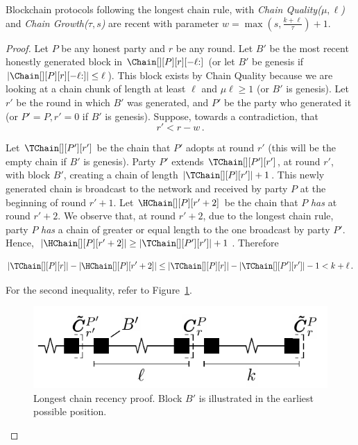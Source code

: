 \begin{lemma}\label{thm.longest-chain-recency}
  Blockchain protocols following the longest chain rule,
  with \emph{Chain Quality($\mu,\ell$)} and
  \emph{Chain Growth($\tau, s$)}
  are recent with parameter $w = \max(s, \frac{k + \ell}{\tau}) + 1$.
\end{lemma}
\begin{proof}
  Let $P$ be any honest party and $r$ be any round.
  Let $B'$ be the most recent honestly generated block
  in $\Chain[][P][r][{-\ell}{:}]$
  (or let $B'$ be genesis if $|\Chain[][P][r][{-\ell}{:}]| \leq \ell$).
  This block exists by
  Chain Quality because we are looking at a chain chunk of length at least $\ell$ and
  $\mu\ell \geq 1$ (or $B'$ is genesis).
  Let $r'$ be the round in which $B'$ was generated, and
  $P'$ be the party who generated it
  (or $P' = P, r' = 0$ if $B'$ is genesis).
  Suppose, towards a contradiction, that
  \begin{equation}
    r' < r - w\,.\label{eq:bitcoin-r-bound}
  \end{equation}

  Let $\TChain[][P'][r']$ be the chain that $P'$ adopts at
  round $r'$ (this will be the empty chain if $B'$ is genesis).
  Party $P'$ extends $\TChain[][P'][r']$, at round $r'$, with block $B'$,
  creating a chain of length $|\TChain[][P][r']| + 1$.
  This newly generated chain is broadcast to the network and
  received by party $P$ at the beginning of round $r' + 1$.
  Let $\HChain[][P][r' + 2]$ be the chain
  that $P$ \emph{has} at round $r' + 2$.
  We observe that, at round $r' + 2$, due to the
  longest chain rule, party $P$ \emph{has} a chain of greater or equal
  length to the one broadcast by party $P'$. Hence,
  $|\HChain[][P][r' + 2]| \geq |\TChain[][P'][r']| + 1$. Therefore

  \begin{equation}
    |\TChain[][P][r]| - |\HChain[][P][r' + 2]| \leq
     |\TChain[][P][r]| - |\TChain[][P'][r']| - 1 <
     k + \ell\,. \label{eq:bitcoin-contradiction}
  \end{equation}

  For the second inequality, refer to Figure~\ref{fig:longest-chain-recency-proof}.

  \begin{figure}
    \centering
    \includegraphics[width=0.5\columnwidth,keepaspectratio]{figures/longest-chain-proof.pdf}
    \caption{Longest chain recency proof. Block $B'$ is illustrated in the
             earliest possible position.
    }
   \label{fig:longest-chain-recency-proof}
  \end{figure}


\end{proof}

